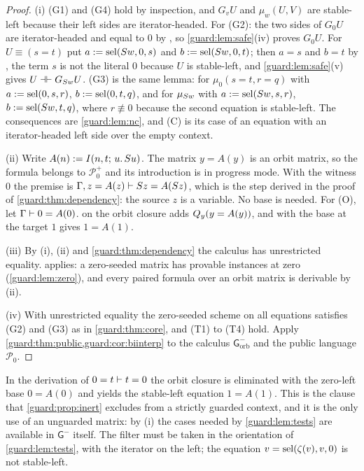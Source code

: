 \begin{proof}
(i) (G1) and (G4) hold by inspection, and $G_vU$ and $\mu_w(U,V)$ are
stable-left because their left sides are iterator-headed.  For (G2): the two
sides of $G_0U$ are iterator-headed and equal to $0$ by , so
\cref{guard:lem:safe}(iv) proves $G_0U$.  For $U\equiv(s=t)$ put
$a\mathrel{:=}\operatorname{sel}(S w,0,s)$ and $b\mathrel{:=}\operatorname{sel}(S w,0,t)$; then $a=s$ and
$b=t$ by , the term $s$ is not the literal $0$ because $U$ is
stable-left, and \cref{guard:lem:safe}(v) gives $U\dashv\vdash G_{S w}U$.
(G3) is the same lemma: for $\mu_0(s=t,r=q)$ with $a\mathrel{:=}\operatorname{sel}(0,s,r)$,
$b\mathrel{:=}\operatorname{sel}(0,t,q)$, and for $\mu_{S w}$ with
$a\mathrel{:=}\operatorname{sel}(S w,s,r)$, $b\mathrel{:=}\operatorname{sel}(S w,t,q)$, where $r\not\equiv 0$
because the second equation is stable-left.  The consequences are
\cref{guard:lem:nc}, and (C) is its case of an equation with an
iterator-headed left side over the empty context.

(ii) Write $A(n)\mathrel{:=}I(n,t;\,u.\,S u)$.  The matrix $y=A(y)$ is an
orbit matrix, so the formula belongs to $\mathcal P_0^{+}$ and its
introduction is in progress mode.  With the witness $0$ the premise is
$\Gamma,z=A(z)\vdash S z=A(S z)$, which is the step derived in the
proof of \cref{guard:thm:dependency}: the source $z$ is a variable.  No base
is needed.  For (O), let $\Gamma\vdash 0=A(0)$.   on the orbit
closure adds $Q_{y}(y=A(y))$, and  with the base at the target
$1$ gives $1=A(1)$.

(iii) By (i), (ii) and \cref{guard:thm:dependency} the calculus has
unrestricted equality.   applies: a zero-seeded
matrix has provable instances at zero (\cref{guard:lem:zero}), and every
paired formula over an orbit matrix is derivable by (ii).

(iv) With unrestricted equality the zero-seeded scheme on all equations
satisfies (G2) and (G3) as in \cref{guard:thm:core}, and (T1) to (T4) hold.
Apply \cref{guard:thm:public,guard:cor:biinterp} to the calculus
$\mathsf G^{-}_{\mathrm{orb}}$ and the public language $\mathcal P_0$.
\end{proof}

In the derivation of $0=t\vdash t=0$ the orbit closure is eliminated with
the zero-left base $0=A(0)$ and yields the stable-left equation $1=A(1)$.
This is the clause that \cref{guard:prop:inert} excludes from a strictly
guarded context, and it is the only use of an unguarded matrix: by (i) the
cases needed by \cref{guard:lem:tests} are available in $\mathsf G^{-}$
itself.  The filter must be taken in the orientation of
\cref{guard:lem:tests}, with the iterator on the left; the equation
$v=\operatorname{sel}(\zeta(v),v,0)$ is not stable-left.

